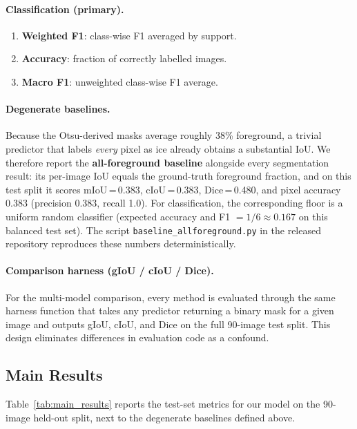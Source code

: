 \documentclass[remotesensing,article,accept,moreauthors,pdftex]{Definitions/mdpi}
\begin{document}
\paragraph{Classification (primary).}
\begin{enumerate}[label=(\roman*), leftmargin=*]
  \item \textbf{Weighted F1}: class-wise F1 averaged by support.

  \item \textbf{Accuracy}: fraction of correctly labelled images.

  \item \textbf{Macro F1}: unweighted class-wise F1 average.
\end{enumerate}

\paragraph{Degenerate baselines.}
Because the Otsu-derived masks average roughly 38\% foreground, a trivial
predictor that labels \emph{every} pixel as ice already obtains a substantial
IoU. We therefore report the \textbf{all-foreground baseline} alongside every
segmentation result: its per-image IoU equals the ground-truth foreground
fraction, and on this test split it scores mIoU\,=\,0.383, cIoU\,=\,0.383,
Dice\,=\,0.480, and pixel accuracy 0.383 (precision 0.383, recall 1.0). For
classification, the corresponding floor is a uniform random classifier
(expected accuracy and F1 $= 1/6 \approx 0.167$ on this balanced test set).
The script \texttt{baseline\_allforeground.py} in the released repository
reproduces these numbers deterministically.

\paragraph{Comparison harness (gIoU / cIoU / Dice).}
For the multi-model comparison, every method is evaluated through the same
harness function that takes any predictor returning a binary mask for a given
image and outputs gIoU, cIoU, and Dice on the full 90-image test split. This
design eliminates differences in evaluation code as a confound.

\subsection{Main Results}
\label{sec:mainresults}

Table~\ref{tab:main_results} reports the test-set metrics for our model on the
90-image held-out split, next to the degenerate baselines defined above.
\end{document}
